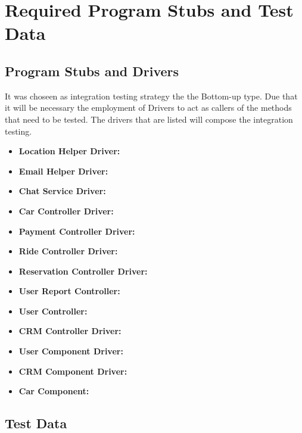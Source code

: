 \documentclass[a4paper]{article}
\begin{document}
\section{Required Program Stubs and Test Data}

\subsection{Program Stubs and Drivers}
It was choseen as integration testing strategy the the Bottom-up type. Due that it will be necessary the employment of Drivers to act as callers of the methods that need to be tested. The drivers that are listed will compose the integration testing.

\begin{itemize}
\item \textbf{Location Helper Driver: }
\item \textbf{Email Helper Driver: }
\item \textbf{Chat Service Driver: }
\item \textbf{Car Controller Driver: } 
\item \textbf{Payment Controller Driver: }
\item \textbf{Ride Controller Driver: } 
\item \textbf{Reservation Controller Driver: } 
\item \textbf{User Report Controller: }
\item \textbf{User Controller: }
\item \textbf{CRM Controller Driver: } 
\item \textbf{User Component Driver: }
\item \textbf{CRM Component Driver: }
\item \textbf{Car Component: }	
\end{itemize}  

\subsection{Test Data}

\newpage
\end{document}

